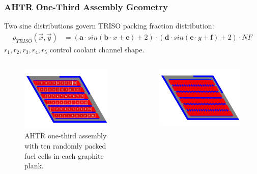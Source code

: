 \begin{frame}
    \frametitle{AHTR One-Third Assembly Geometry}
    Two sine distributions govern TRISO packing fraction distribution: 
    \begin{align}
        \rho_{TRISO}(\vec{x}, \vec{y}) &= \left(\textbf{a}\cdot sin(\textbf{b}\cdot x + \textbf{c}) + 2\right) 
    \cdot \left(\textbf{d}\cdot sin(\textbf{e}\cdot y + \textbf{f}) + 2\right) \cdot NF \nonumber
    \end{align}
    $r_1, r_2, r_3, r_4, r_5$ control coolant channel shape.
    \begin{columns}
        \begin{column}{0.5\textwidth}
            \begin{figure}
                \includegraphics[width=\linewidth]{../docs/figures/ahtr_assembly.png} 
                \caption{AHTR one-third assembly with ten randomly packed fuel cells in 
                each graphite plank.}
            \end{figure}
        \end{column}
        \begin{column}{0.5\textwidth} 
            \begin{figure}
                \includegraphics[width=\linewidth]{../docs/figures/coolant-channel-shape-assem.png} 

\end{figure}
\end{column}
\end{columns}
\end{frame}
